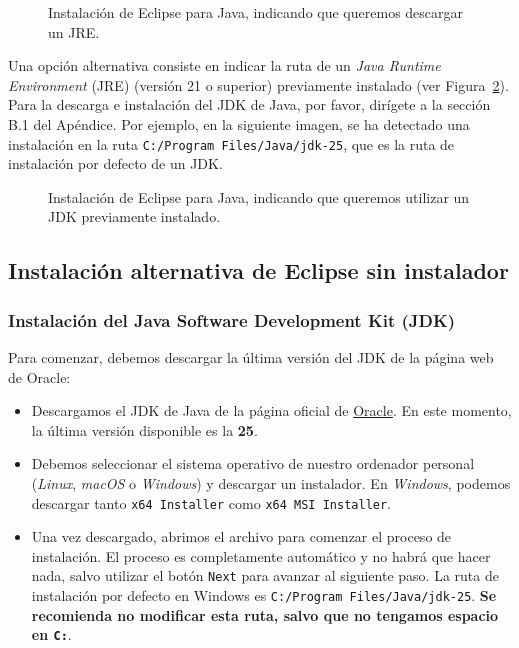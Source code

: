 \documentclass[
  spanish,
  11pt,
  a4paper,
  DIV=11,
  numbers=noendperiod]{scrartcl}
\providecommand{\tightlist}{%
  \setlength{\itemsep}{0pt}\setlength{\parskip}{0pt}}
\begin{document}
\begin{figure}
\caption{Instalación de Eclipse para Java, indicando que queremos descargar un JRE.}\label{fig-jre_installation}
\end{figure}

Una opción alternativa consiste en indicar la ruta de un \emph{Java Runtime Environment} (JRE) (versión 21 o superior) previamente instalado (ver Figura~\ref{fig-jdk_installation}). Para la descarga e instalación del JDK de Java, por favor, dirígete a la sección B.1 del Apéndice. Por ejemplo, en la siguiente imagen, se ha detectado una instalación en la ruta \texttt{C:/Program\ Files/Java/jdk-25}, que es la ruta de instalación por defecto de un JDK.

\begin{figure}
\caption{Instalación de Eclipse para Java, indicando que queremos utilizar un JDK previamente instalado.}\label{fig-jdk_installation}
\end{figure}

\subsection{Instalación alternativa de Eclipse sin instalador}\label{instalaciuxf3n-alternativa-de-eclipse-sin-instalador}

\subsubsection{Instalación del Java Software Development Kit (JDK)}\label{instalaciuxf3n-del-java-software-development-kit-jdk}

Para comenzar, debemos descargar la última versión del JDK de la página web de Oracle:

\begin{itemize}
\tightlist
\item
 Descargamos el JDK de Java de la página oficial de \href{https://www.oracle.com/es/java/technologies/downloads/}{Oracle}. En este momento, la última versión disponible es la \textbf{25}.
\item
 Debemos seleccionar el sistema operativo de nuestro ordenador personal (\emph{Linux}, \emph{macOS} o \emph{Windows}) y descargar un instalador. En \emph{Windows}, podemos descargar tanto \texttt{x64\ Installer} como \texttt{x64\ MSI\ Installer}.
\item
 Una vez descargado, abrimos el archivo para comenzar el proceso de instalación. El proceso es completamente automático y no habrá que hacer nada, salvo utilizar el botón \texttt{Next} para avanzar al siguiente paso. La ruta de instalación por defecto en Windows es \texttt{C:/Program\ Files/Java/jdk-25}. \textbf{Se recomienda no modificar esta ruta, salvo que no tengamos espacio en \texttt{C:}}.
\end{itemize}
\end{document}
